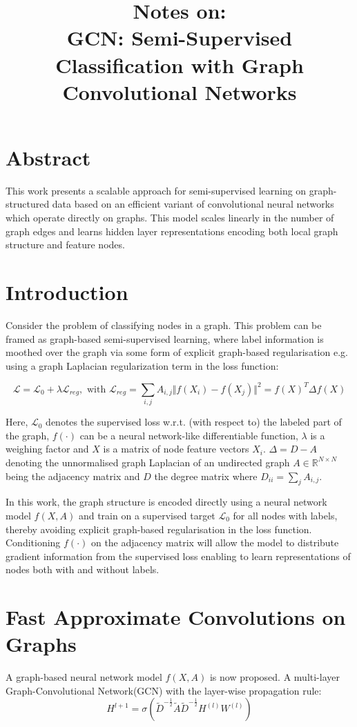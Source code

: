 \documentclass{article}
\title{\textbf{Notes on:}\\ GCN: Semi-Supervised Classification with Graph Convolutional Networks}
\begin{document}
\maketitle{}
\section{Abstract}
This work presents a scalable approach for semi-supervised learning on
graph-structured data based on an efficient variant of convolutional neural
networks which operate directly on graphs. This model scales linearly in the
number of graph edges and learns hidden layer representations encoding both
local graph structure and feature nodes.

\section{Introduction}
Consider the problem of classifying nodes in a graph. This problem can be
framed as graph-based semi-supervised learning, where label information is
moothed over the graph via some form of explicit graph-based regularisation
e.g. using a graph Laplacian regularization term in the loss function:

\begin{equation}
  \mathcal{L} = \mathcal{L}_0 + \lambda \mathcal{L}_{reg} , \text{   with   }
  \mathcal{L}_{reg} = \sum_{i,j} A_{i,j}\Vert f(X_i) - f(X_j)\Vert^2 = f(X)^T
  \Delta f(X)
  \label{eq:1}
\end{equation}

Here, $\mathcal{L}_0$ denotes the supervised loss w.r.t. (with respect to) the
labeled part of the graph, $f(\cdot)$ can be a neural network-like
differentiable function, $\lambda$ is a weighing factor and $X$ is a matrix of
node feature vectors $X_i$. $\Delta = D - A$ denoting the unnormalised graph
Laplacian of an undirected graph $A \in \mathbb{R}^{N \times N}$ being the
adjacency matrix and $D$ the degree matrix where $D_{ii} = \sum_j A_{i,j}$.

In this work, the graph structure is encoded directly using a neural network
model $f(X,A)$ and train on a supervised target $\mathcal{L}_0$ for all nodes
with labels, thereby avoiding explicit graph-based regularisation in the loss
function. Conditioning $f(\cdot)$ on the adjacency matrix will allow the model
to distribute gradient information from the supervised loss enabling to learn
representations of nodes both with and without labels.

\section{Fast Approximate Convolutions on Graphs}
A graph-based neural network model $f(X,A)$ is now proposed. A multi-layer
Graph-Convolutional Network(GCN) with the layer-wise propagation rule:
\begin{equation}
  H^{l+1} = \sigma\left(\tilde{D}^{-\frac{1}{2}} \tilde{A} \tilde{D}^{-\frac{1}{2}}H^{(l)} W^{(l)}\right)
  \label{eq:2}
\end{equation}
\end{document}

